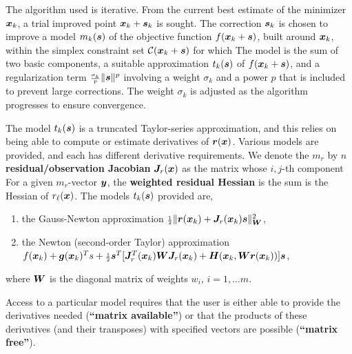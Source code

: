 \documentclass{galahad}
\begin{document}

\galterminology
The algorithm used is iterative. From the current best estimate
of the minimizer ${\bm{x}}_k$, a trial improved point ${\bm{x}}_k + {\bm{s}}_k$ is sought.
The correction ${\bm{s}}_k$ is chosen to improve a model $m_k({\bm{s}})$ of
the objective function $f({\bm{x}}_k+{\bm{s}})$, built around ${\bm{x}}_k$, within the 
simplex constraint set $\calC(\bmx_k+\bms)$ for which 
The model is the sum of two basic components,
a suitable approximation $t_k({\bm{s}})$ of $f({\bm{x}}_k+{\bm{s}})$,
and a regularization term ${\scriptstyle \frac{\sigma_k}{p}} \|{\bm{s}}\|^p$
involving a weight $\sigma_k$ and a power $p$
that is included to prevent large corrections.
The weight  $\sigma_k$ is adjusted as the algorithm progresses to
ensure convergence.

The model $t_k({\bm{s}})$ is a truncated Taylor-series approximation, and this
relies on being able to compute or estimate derivatives of ${\bm{r}}({\bm{x}})$.
Various models are provided, and each has different derivative requirements.
We denote the $m_r$ by $n$ {\bf residual/observation Jacobian} 
${\bm{J}}_r({\bm{x}})$ as the matrix whose $i,j$-th component
For a given $m_r$-vector ${\bm{y}}$, the
{\bf weighted residual Hessian} is the sum
is the Hessian of $r_\ell({\bm{x}})$.
The models $t_k({\bm{s}})$ provided are,
\begin{enumerate}
\item the Gauss-Newton approximation
  ${\scriptstyle \frac{1}{2}} \| {\bm{r}}({\bm{x}}_k) + {\bm{J}}_r({\bm{x}}_k) {\bm{s}}\|_{{\bm{W}}}^2$,
\item the Newton (second-order Taylor) approximation
  $f({\bm{x}}_k) + {\bm{g}}({\bm{x}}_k)^T s + {\scriptstyle \frac{1}{2}} {\bm{s}}^T
  [ {\bm{J}}_r^T({\bm{x}}_k) {\bm{W}} {\bm{J}}_r({\bm{x}}_k) + {\bm{H}}({\bm{x}}_k,{\bm{W}} {\bm{r}}({\bm{x}}_k))] {\bm{s}}$,
\end{enumerate}
where ${\bm{W}}$ is the diagonal matrix of weights $w_i$, $i = 1, \ldots m$.

\noindent
Access to a particular model requires that the user is either able to
provide the derivatives needed ({\bf ``matrix available''}) or that the products
of these derivatives (and their transposes) with specified vectors are possible
({\bf ``matrix free''}).
\end{document}

